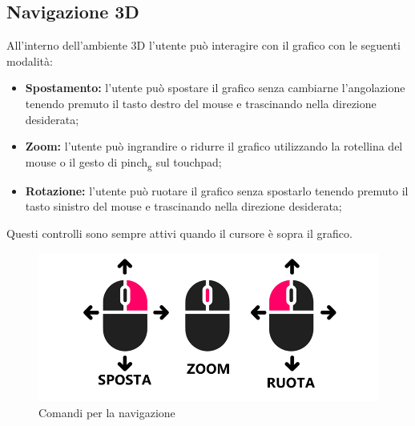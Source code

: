 \subsection{Navigazione 3D}
All'interno dell'ambiente 3D l'utente può interagire con il grafico con le
seguenti modalità:
\begin{itemize}
    \item \textbf{Spostamento:} l'utente può spostare il grafico senza cambiarne
          l'angolazione tenendo premuto il tasto destro del mouse e trascinando
          nella direzione desiderata;
    \item \textbf{Zoom:} l'utente può ingrandire o ridurre il grafico
          utilizzando la rotellina del mouse o il gesto di pinch\textsubscript{g} sul touchpad;
    \item \textbf{Rotazione:} l'utente può ruotare il grafico senza spostarlo
          tenendo premuto il tasto sinistro del mouse e trascinando nella direzione desiderata;
\end{itemize}
Questi controlli sono sempre attivi quando il cursore è sopra il grafico.
\begin{figure}[ht!]
    \centering
    \includegraphics[scale=0.6]{template/images/comandi.png}
    \caption{Comandi per la navigazione}
\end{figure}

